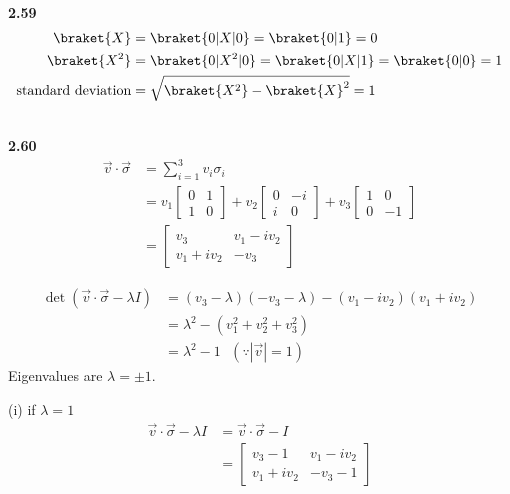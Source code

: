 \documentclass[10pt]{book}
\newcommand{\Textbf}[1]{\hspace{3mm}\\ \textbf{#1}\\}
\begin{document}
	
	\Textbf{2.59}
	\begin{equation}
\begin{aligned}
		\braket{X} &= \braket{0 | X | 0} = \braket{0 | 1} = 0\\
		\braket{X^2} &= \braket{0 | X^2 | 0} = \braket{0 | X | 1} =\braket{0 | 0} = 1\\
		\text{standard deviation} &= \sqrt{ \braket{X^2} - \braket{X}^2 } = 1
	\end{aligned}
\end{equation}
	
	
	\Textbf{2.60}
	\begin{equation}
\begin{aligned}
		\vec{v} \cdot \vec{\sigma} &= \sum_{i=1}^3 v_i \sigma_i\\
		&= v_1 \begin{bmatrix}
			0 & 1 \\
			1 & 0
		\end{bmatrix}
		+ v_2 \begin{bmatrix}
			0 & -i \\
			i & 0
		\end{bmatrix}
		+ v_3 \begin{bmatrix}
			1 & 0 \\
			0 & -1
		\end{bmatrix} \\
		&= \begin{bmatrix}
			v_3 & v_1 - i v_2 \\
			v_1 + iv_2 & -v_3
		\end{bmatrix}
	\end{aligned}
\end{equation}
	
	\begin{equation}
\begin{aligned}
		\det (\vec{v} \cdot \vec{\sigma}  - \lambda I) &= (v_3 - \lambda) (-v_3 - \lambda) - (v_1 - iv_2) (v_1 + iv_2)\\
		&= \lambda^2 - (v_1^2 + v_2^2  + v_3^2)\\
		&= \lambda^2 - 1 ~~~ (\because |\vec{v}| = 1)
	\end{aligned}
\end{equation}
	Eigenvalues are $\lambda = \pm 1$.
	
	
	(i) if $\lambda = 1$
	\begin{equation}
\begin{aligned}
		\vec{v} \cdot \vec{\sigma}  - \lambda I &= \vec{v} \cdot \vec{\sigma}  - I\\
		&= \begin{bmatrix}
			v_3 - 1 & v_1 - i v_2 \\
			v_1 + i v_2 & - v_3 - 1
		\end{bmatrix}
	\end{aligned}
\end{equation}
	
\end{document}
